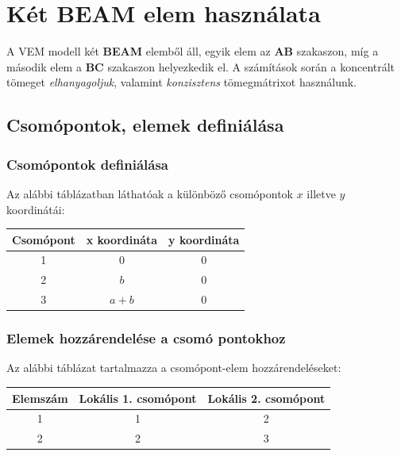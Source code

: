 \documentclass[12pt,a4paper]{article}
\begin{document}
\section{Két BEAM elem használata}
A VEM modell két \textbf{BEAM} elemből áll, egyik elem az \textbf{AB} szakaszon,
míg a második elem a \textbf{BC} szakaszon helyezkedik el. A számítások során
a koncentrált tömeget \textit{elhanyagoljuk}, valamint \textit{konzisztens} tömegmátrixot
használunk.
\subsection{Csomópontok, elemek definiálása}
\subsubsection{Csomópontok definiálása}
Az alábbi táblázatban láthatóak a különböző csomópontok $x$ illetve
$y$ koordinátái:
\begin{center}
    \begin{tabular}{|c|c|c|}
        \hline
        Csomópont & x koordináta & y koordináta \\
        \hline
        \hline
        1         & 0            & $0$          \\
        \hline
        2         & $b$          & $0$          \\
        \hline
        3         & $a+b$        & $0$          \\
        \hline
    \end{tabular}
\end{center}

\subsubsection{Elemek hozzárendelése a csomó pontokhoz}
Az alábbi táblázat tartalmazza a csomópont-elem hozzárendeléseket:
\begin{center}
    \begin{tabular}{|c|c|c|}
        \hline
        Elemszám & Lokális 1. csomópont & Lokális 2. csomópont \\
        \hline
        \hline
        1        & 1                    & 2                    \\
        \hline
        2        & 2                    & 3                    \\
        \hline
    \end{tabular}
\end{center}
\end{document}
